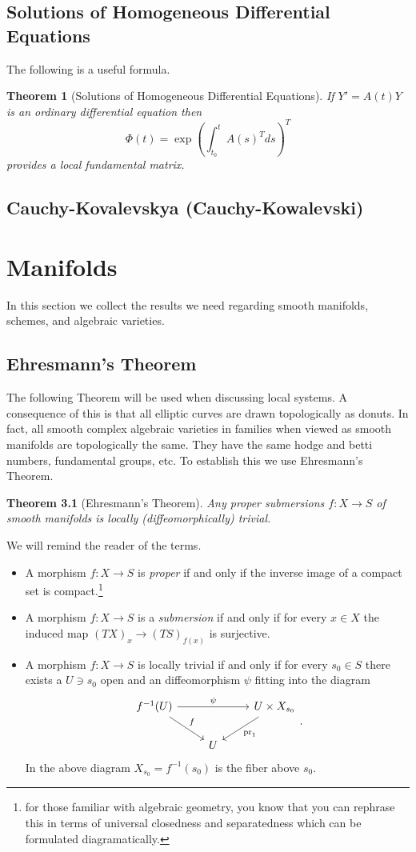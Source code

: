 \documentclass[12pt]{book}
\numberwithin{equation}{section}
\newtheorem{theorem}{Theorem}[subsection]
\theoremstyle{definition}
\theoremstyle{remark}
\newcommand{\pr}{\operatorname{pr}}
\begin{document}
\section{Solutions of Homogeneous Differential Equations}
The following is a useful formula.
\begin{theorem}[Solutions of Homogeneous Differential Equations]\label{T:solutions}
	If $Y'= A(t)Y$ is an ordinary differential equation then 
	 $$ \Phi(t) = \exp( \int_{t_0}^t A(s)^T ds )^T $$
	provides a local fundamental matrix. 
\end{theorem}



\section{Cauchy-Kovalevskya (Cauchy-Kowalevski)}

\chapter[Spaces]{Manifolds}
In this section we collect the results we need regarding smooth manifolds, schemes, and algebraic varieties.
\section{Ehresmann's Theorem}
The following Theorem will be used when discussing local systems. 
A consequence of this is that all elliptic curves are drawn topologically as donuts. 
In fact, all smooth complex algebraic varieties in families when viewed as smooth manifolds are topologically the same. 
They have the same hodge and betti numbers, fundamental groups, etc. 
To establish this we use Ehresmann's Theorem.
\begin{theorem}[Ehresmann's Theorem]
	Any proper submersions $f:X\to S$ of smooth manifolds is locally (diffeomorphically) trivial. 
\end{theorem}
We will remind the reader of the terms.
\begin{itemize}
	\item A morphism $f:X\to S$ is \emph{proper} if and only if the inverse image of a compact set is compact.\footnote{for those familiar with algebraic geometry, you know that you can rephrase this in terms of universal closedness and separatedness which can be formulated diagramatically.}
	\item A morphism $f:X\to S$ is a \emph{submersion} if and only if for every $x\in X$ the induced map $(TX)_x \to (TS)_{f(x)}$ is surjective. 
	\item A morphism $f:X\to S$ is locally trivial if and only if for every $s_0 \in S$ there exists a $U \owns s_0$ open and an diffeomorphism $\psi$ fitting into the diagram
	$$\begin{tikzcd}
	f^{-1}(U) \ar[rr, "\psi"]\ar[dr, "f"]& & U \times X_{s_0} \ar[dl, "\pr_1"] \\
	& U & 
	\end{tikzcd}.$$	
	In the above diagram $X_{s_0} = f^{-1}(s_0)$ is the fiber above $s_0$.
\end{itemize}
\end{document}
